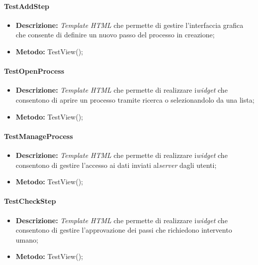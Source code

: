 \paragraph{TestAddStep}
\begin{itemize}
\item \textbf{Descrizione:} \textit{Template HTML} che permette di gestire l'interfaccia grafica che consente di definire un nuovo passo del processo in creazione;
\item \textbf{Metodo:} TestView();
\end{itemize}

\paragraph{TestOpenProcess}
\begin{itemize}
\item \textbf{Descrizione:} \textit{Template HTML} che permette di realizzare i\textit{widget} che consentono di aprire un processo tramite ricerca o selezionandolo da una lista;
\item \textbf{Metodo:} TestView();
\end{itemize}

\paragraph{TestManageProcess}
\begin{itemize}
\item \textbf{Descrizione:} \textit{Template HTML} che permette di realizzare i\textit{widget} che consentono di gestire l'accesso ai dati inviati al\textit{server} dagli utenti;
\item \textbf{Metodo:} TestView();
\end{itemize}

\paragraph{TestCheckStep}
\begin{itemize}
\item \textbf{Descrizione:} \textit{Template HTML} che permette di realizzare i\textit{widget} che consentono di gestire l'approvazione dei passi che richiedono intervento umano;
\item \textbf{Metodo:} TestView();
\end{itemize}
